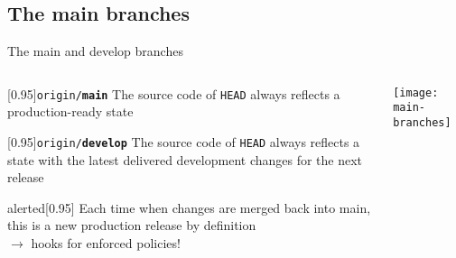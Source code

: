 \documentclass[usenames,svgnames,14pt]{beamer}
\newcommand{\mainBranchColor}{PQ}
\newcommand{\branch}[2]{\textcolor{#1}{\texttt{\bfseries #2}}}
\newcommand{\main}{\branch{\mainBranchColor}{main}}
\newcommand{\develop}{\branch{\mainBranchColor}{develop}}
\begin{document}
\subsection{The main branches}
\begin{frame}[c]{The main and develop branches}
    \small
    \begin{columns}[b]
        \begin{column}{0.5\textwidth}
            \vspace{-3mm}
            \begin{varblock}{}[0.95\textwidth]{\texttt{origin/\main}}
                The source code of \texttt{HEAD} always reflects a production-ready state
            \end{varblock}
            \vspace{-1mm}
            \begin{varblock}{}[0.95\textwidth]{\texttt{origin/\develop}}
                The source code of \texttt{HEAD} always reflects a state
                with the latest delivered development changes for the next release
            \end{varblock}
            \begin{varblock}{alerted}[0.95\textwidth]{}
                \alert{Each time when changes are merged back into main, this is a new production release by definition}\\
                {\scriptsize $\to$ hooks for enforced policies!}
            \end{varblock}
        \end{column}
        \begin{column}{0.4\textwidth}
            \texttt{[image: main-branches]}
        \end{column}
    \end{columns}
\end{frame}

\end{document}
